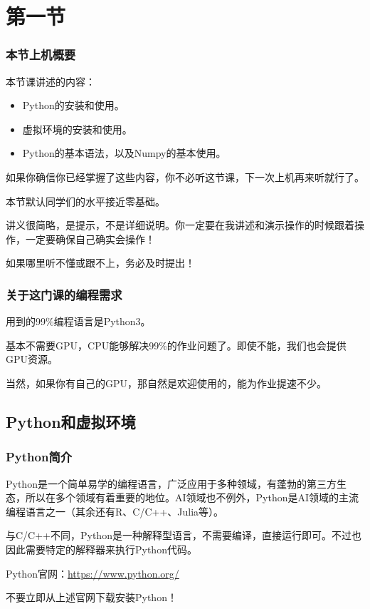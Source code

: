 \section{第一节}

\begin{frame}
    \frametitle{本节上机概要}

    本节课讲述的内容：
    \begin{itemize}
        \item Python的安装和使用。
        \item 虚拟环境的安装和使用。
        \item Python的基本语法，以及Numpy的基本使用。
    \end{itemize}
    如果你确信你已经掌握了这些内容，你不必听这节课，下一次上机再来听就行了。

    本节默认同学们的水平接近零基础。

    \alert{讲义很简略，是提示，不是详细说明。你一定要在我讲述和演示操作的时候跟着操作，一定要确保自己确实会操作！}

    \alert{如果哪里听不懂或跟不上，务必及时提出！}

\end{frame}

\begin{frame}
    \frametitle{关于这门课的编程需求}

    用到的99\%编程语言是Python3。

    基本不需要GPU，CPU能够解决99\%的作业问题了。即使不能，我们也会提供GPU资源。

    当然，如果你有自己的GPU，那自然是欢迎使用的，能为作业提速不少。

\end{frame}

\subsection{Python和虚拟环境}

\begin{frame}
    \frametitle{Python简介}

    Python是一个简单易学的编程语言，广泛应用于多种领域，有蓬勃的第三方生态，所以在多个领域有着重要的地位。AI领域也不例外，Python是AI领域的主流编程语言之一（其余还有R、C/C++、Julia等）。

    与C/C++不同，Python是一种解释型语言，不需要编译，直接运行即可。不过也因此需要特定的解释器来执行Python代码。

    Python官网：\url{https://www.python.org/}

    \alert{不要立即从上述官网下载安装Python！}

\end{frame}


